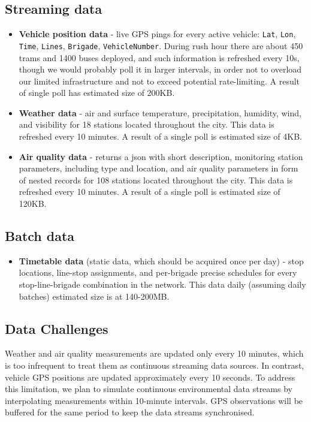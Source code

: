 \documentclass[11pt]{article}
\begin{document}
\subsection{Streaming data}
\begin{itemize}

  \item \textbf{Vehicle position data} - live GPS
    pings for every active vehicle: \texttt{Lat}, \texttt{Lon}, \texttt{Time},
    \texttt{Lines}, \texttt{Brigade}, \texttt{VehicleNumber}. During rush hour there are about 450 trams and 1400 buses deployed, and such information is refreshed every 10s, though we would probably poll it in larger intervals, in order not to overload our limited infrastructure and not to exceed potential rate-limiting. A result of single poll has estimated size of 200KB.
  \item \textbf{Weather data} - air and surface temperature,
    precipitation, humidity, wind, and visibility for 18 stations located throughout the city. This data is refreshed every 10 minutes. A result of a single poll is estimated size of 4KB.
     \item \textbf{Air quality data} - returns a json with short description, monitoring station parameters, including type and location, and air quality parameters in form of nested records for 108 stations located throughout the city. This data is refreshed every 10 minutes. A result of a single poll is estimated size of 120KB.
\end{itemize}
\subsection{Batch data}
\begin{itemize}
  \item  \textbf{Timetable data} (static data, which should be acquired once per day) -
    stop locations, line-stop assignments, and per-brigade precise schedules
    for every  stop-line-brigade combination in the network. This data daily (assuming daily batches) estimated size is at 140-200MB.
\end{itemize}
\subsection{Data Challenges}
Weather and air quality measurements are updated only every 10 minutes, which is too infrequent to treat them as continuous streaming data sources. In contrast, vehicle GPS positions are updated approximately every 10 seconds.
To address this limitation, we plan to simulate continuous environmental data streams by interpolating measurements within 10-minute intervals. GPS observations will be buffered for the same period to keep the data streams synchronised.
\end{document}
